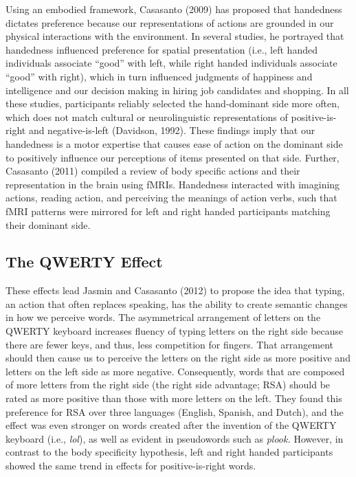 \documentclass[english,man]{apa6}
\theoremstyle{definition}
\theoremstyle{definition}
\theoremstyle{definition}
\theoremstyle{remark}
\begin{document}
Using an embodied framework, Casasanto (2009) has proposed that
handedness dictates preference because our representations of actions
are grounded in our physical interactions with the environment. In
several studies, he portrayed that handedness influenced preference for
spatial presentation (i.e., left handed individuals associate
\enquote{good} with left, while right handed individuals associate
\enquote{good} with right), which in turn influenced judgments of
happiness and intelligence and our decision making in hiring job
candidates and shopping. In all these studies, participants reliably
selected the hand-dominant side more often, which does not match
cultural or neurolinguistic representations of positive-is-right and
negative-is-left (Davidson, 1992). These findings imply that our
handedness is a motor expertise that causes ease of action on the
dominant side to positively influence our perceptions of items presented
on that side. Further, Casasanto (2011) compiled a review of body
specific actions and their representation in the brain using fMRIs.
Handedness interacted with imagining actions, reading action, and
perceiving the meanings of action verbs, such that fMRI patterns were
mirrored for left and right handed participants matching their dominant
side.

\subsection{The QWERTY Effect}\label{the-qwerty-effect}

These effects lead Jasmin and Casasanto (2012) to propose the idea that
typing, an action that often replaces speaking, has the ability to
create semantic changes in how we perceive words. The asymmetrical
arrangement of letters on the QWERTY keyboard increases fluency of
typing letters on the right side because there are fewer keys, and thus,
less competition for fingers. That arrangement should then cause us to
perceive the letters on the right side as more positive and letters on
the left side as more negative. Consequently, words that are composed of
more letters from the right side (the right side advantage; RSA) should
be rated as more positive than those with more letters on the left. They
found this preference for RSA over three languages (English, Spanish,
and Dutch), and the effect was even stronger on words created after the
invention of the QWERTY keyboard (i.e., \emph{lol}), as well as evident
in pseudowords such as \emph{plook.} However, in contrast to the body
specificity hypothesis, left and right handed participants showed the
same trend in effects for positive-is-right words.
\end{document}
